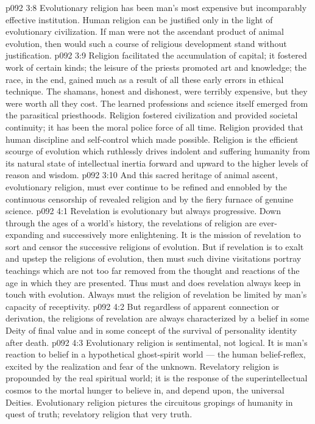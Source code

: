 \vs p092 3:8 \pc Evolutionary religion has been man’s most expensive but incomparably effective institution. Human religion can be justified only in the light of evolutionary civilization. If man were not the ascendant product of animal evolution, then would such a course of religious development stand without justification.
\vs p092 3:9 \pc Religion facilitated the accumulation of capital; it fostered work of certain kinds; the leisure of the priests promoted art and knowledge; the race, in the end, gained much as a result of all these early errors in ethical technique. The shamans, honest and dishonest, were terribly expensive, but they were worth all they cost. The learned professions and science itself emerged from the parasitical priesthoods. Religion fostered civilization and provided societal continuity; it has been the moral police force of all time. Religion provided that human discipline and self\hyp{}control which made  possible. Religion is the efficient scourge of evolution which ruthlessly drives indolent and suffering humanity from its natural state of intellectual inertia forward and upward to the higher levels of reason and wisdom.
\vs p092 3:10 And this sacred heritage of animal ascent, evolutionary religion, must ever continue to be refined and ennobled by the continuous censorship of revealed religion and by the fiery furnace of genuine science.
\vs p092 4:1 Revelation is evolutionary but always progressive. Down through the ages of a world’s history, the revelations of religion are ever\hyp{}expanding and successively more enlightening. It is the mission of revelation to sort and censor the successive religions of evolution. But if revelation is to exalt and upstep the religions of evolution, then must such divine visitations portray teachings which are not too far removed from the thought and reactions of the age in which they are presented. Thus must and does revelation always keep in touch with evolution. Always must the religion of revelation be limited by man’s capacity of receptivity.
\vs p092 4:2 But regardless of apparent connection or derivation, the religions of revelation are always characterized by a belief in some Deity of final value and in some concept of the survival of personality identity after death.
\vs p092 4:3 Evolutionary religion is sentimental, not logical. It is man’s reaction to belief in a hypothetical ghost\hyp{}spirit world --- the human belief\hyp{}reflex, excited by the realization and fear of the unknown. Revelatory religion is propounded by the real spiritual world; it is the response of the superintellectual cosmos to the mortal hunger to believe in, and depend upon, the universal Deities. Evolutionary religion pictures the circuitous gropings of humanity in quest of truth; revelatory religion  that very truth.
